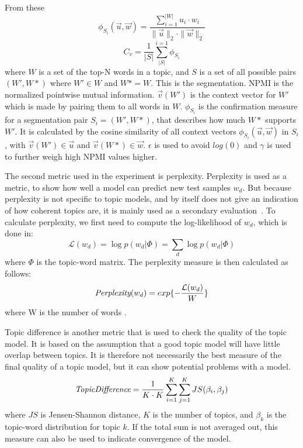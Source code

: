 From these 
\begin{equation}\label{eq:coherence_3}
	\phi_{S_i}(\overrightarrow{u}, \overrightarrow{w}) = \frac
	{\sum_{i = 1}^{|W|} u_i \cdot w_i}
	{\|\overrightarrow{u}\|_2 \cdot \|\overrightarrow{w}\|_2}
\end{equation}
\begin{equation}\label{eq:coherence_4}
	C_v = \frac{1}{|S|}\sum_{|S|}^{i=1}\phi_{S_i}
\end{equation}
\noindent where $W$ is a set of the top-N words in a topic, and $S$ is a set of all possible pairs $(W',W*)$ where $W'\in W$ and $W* = W$.
This is the segmentation.
NPMI is the normalized pointwise mutual information.
$\overrightarrow{v}(W')$ is the context vector for $W'$ which is made by pairing them to all words in $W$.
$\phi_{S_i}$ is the confirmation measure for a segmentation pair $S_i = (W',W*)$, that describes how much $W*$ supports $W'$.
It is calculated by the cosine similarity of all context vectors $\phi_{S_i}(\overrightarrow{u},\overrightarrow{w})$ in $S_i$, with $\overrightarrow{v}(W') \in \overrightarrow{u}$ and $\overrightarrow{v}(W*) \in \overrightarrow{w}$.
$\epsilon$ is used to avoid $log(0)$ and $\gamma$ is used to further weigh high NPMI values higher.

The second metric used in the experiment is perplexity.
Perplexity is used as a metric, to show how well a model can predict new test samples $w_d$.
But because perplexity is not specific to topic models, and by itself does not give an indication of how coherent topics are, it is mainly used as a secondary evaluation~\cite{tea_leaves}.
To calculate perplexity, we first need to compute the log-likelihood of $w_d$, which is done in:
\begin{equation}\label{eq:likelihood}
	\mathcal{L}(w_d) = \log p(w_d|\Phi) = \sum_{d} \log p(w_d|\Phi)
\end{equation}
\noindent where $\Phi$ is the topic-word matrix.
The perplexity measure is then calculated as follows:
\begin{equation}
	\emph{Perplexity}(w_d) = exp \{-\frac{\mathcal{L}(w_d)}{W}\}
\end{equation}
\noindent where W is the number of words \cite{de2008evaluating}.

Topic difference is another metric that is used to check the quality of the topic model.
It is based on the assumption that a good topic model will have little overlap between topics.
It is therefore not necessarily the best measure of the final quality of a topic model, but it can show potential problems with a model.
\begin{equation}
	\emph{TopicDifference} = \frac{1}{K \cdot K} \sum_{i=1}^{K} \sum_{j=1}^{K} JS(\beta_{i},\beta_{j})
\end{equation}
\noindent where $JS$ is Jensen-Shannon distance, $K$ is the number of topics, and $\beta_{k}$ is the topic-word distribution for topic $k$.
If the total sum is not averaged out, this measure can also be used to indicate convergence of the model.

